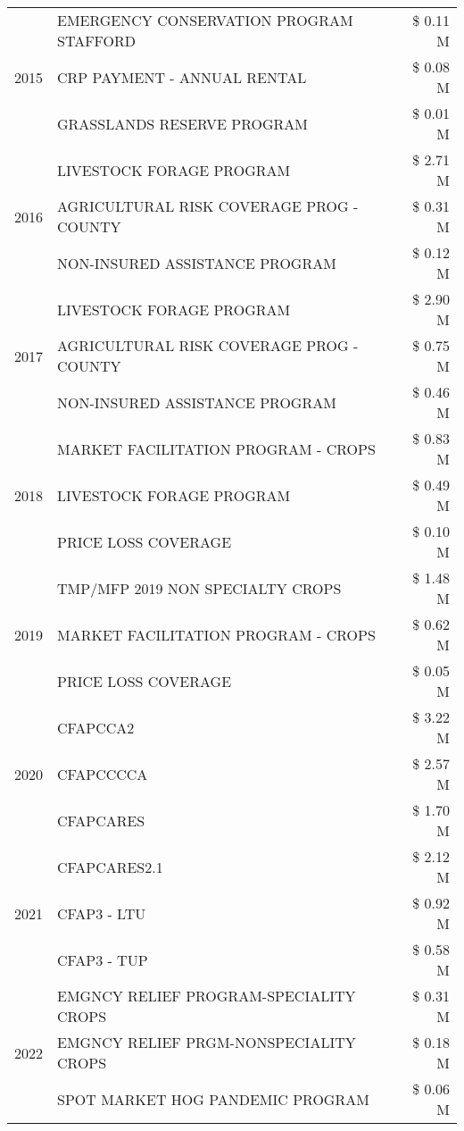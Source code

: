 \begin{tabular}{llr}
\cline{1-3}
\multirow[t]{3}{*}{2015} & EMERGENCY CONSERVATION PROGRAM STAFFORD & \$ 0.11 M \\
 & CRP PAYMENT - ANNUAL RENTAL & \$ 0.08 M \\
 & GRASSLANDS RESERVE PROGRAM & \$ 0.01 M \\
\cline{1-3}
\multirow[t]{3}{*}{2016} & LIVESTOCK FORAGE PROGRAM & \$ 2.71 M \\
 & AGRICULTURAL RISK COVERAGE PROG - COUNTY & \$ 0.31 M \\
 & NON-INSURED ASSISTANCE PROGRAM & \$ 0.12 M \\
\cline{1-3}
\multirow[t]{3}{*}{2017} & LIVESTOCK FORAGE PROGRAM & \$ 2.90 M \\
 & AGRICULTURAL RISK COVERAGE PROG - COUNTY & \$ 0.75 M \\
 & NON-INSURED ASSISTANCE PROGRAM & \$ 0.46 M \\
\cline{1-3}
\multirow[t]{3}{*}{2018} & MARKET FACILITATION PROGRAM - CROPS & \$ 0.83 M \\
 & LIVESTOCK FORAGE PROGRAM & \$ 0.49 M \\
 & PRICE LOSS COVERAGE & \$ 0.10 M \\
\cline{1-3}
\multirow[t]{3}{*}{2019} & TMP/MFP 2019 NON SPECIALTY CROPS & \$ 1.48 M \\
 & MARKET FACILITATION PROGRAM - CROPS & \$ 0.62 M \\
 & PRICE LOSS COVERAGE & \$ 0.05 M \\
\cline{1-3}
\multirow[t]{3}{*}{2020} & CFAPCCA2 & \$ 3.22 M \\
 & CFAPCCCCA & \$ 2.57 M \\
 & CFAPCARES & \$ 1.70 M \\
\cline{1-3}
\multirow[t]{3}{*}{2021} & CFAPCARES2.1 & \$ 2.12 M \\
 & CFAP3 - LTU & \$ 0.92 M \\
 & CFAP3 - TUP & \$ 0.58 M \\
\cline{1-3}
\multirow[t]{3}{*}{2022} & EMGNCY RELIEF PROGRAM-SPECIALITY CROPS & \$ 0.31 M \\
 & EMGNCY RELIEF PRGM-NONSPECIALITY CROPS & \$ 0.18 M \\
 & SPOT MARKET HOG PANDEMIC PROGRAM & \$ 0.06 M \\
\cline{1-3}
\bottomrule
\end{tabular}
